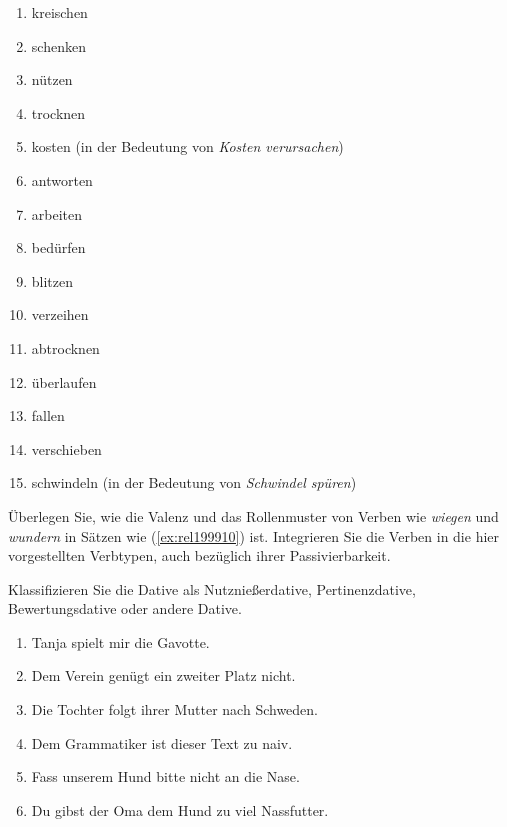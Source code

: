\begin{enumerate}\Lf
  \item kreischen
  \item schenken
  \item nützen
  \item trocknen
  \item kosten (in der Bedeutung von \textit{Kosten verursachen})
  \item antworten
  \item arbeiten 
  \item bedürfen
  \item blitzen
  \item verzeihen
  \item abtrocknen
  \item überlaufen
  \item fallen
  \item verschieben
  \item schwindeln (in der Bedeutung von \textit{Schwindel spüren})
\end{enumerate}

\Uebung[\tristar] \label{u133} Überlegen Sie, wie die Valenz und das Rollenmuster von Verben wie \textit{wiegen} und \textit{wundern} in Sätzen wie (\ref{ex:rel199910}) ist.
Integrieren Sie die Verben in die hier vorgestellten Verbtypen, auch bezüglich ihrer Passivierbarkeit.

\begin{exe}
  \ex\label{ex:rel199910}
  \begin{xlist}
  \end{xlist}
\end{exe}

\Uebung \label{u134} Klassifizieren Sie die Dative als Nutznießerdative, Pertinenzdative, Bewertungsdative oder andere Dative.

\begin{enumerate}\Lf
  \item Tanja spielt mir die Gavotte.
  \item Dem Verein genügt ein zweiter Platz nicht.
  \item Die Tochter folgt ihrer Mutter nach Schweden.
  \item Dem Grammatiker ist dieser Text zu naiv.
  \item Fass unserem Hund bitte nicht an die Nase.
  \item Du gibst der Oma dem Hund zu viel Nassfutter.
\end{enumerate}

